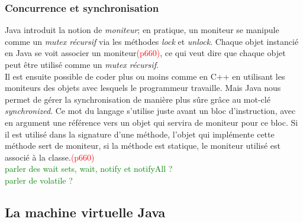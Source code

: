 \documentclass[a4paper,twoside,10pt,english,french,twocolumn]{article}
\theoremstyle{definition}
\theoremstyle{remark}
\theoremstyle{plain}
\begin{document}
\subsubsection*{Concurrence et synchronisation}
Java introduit la notion de \textit{moniteur}; en pratique, un moniteur se manipule comme un \textit{mutex récursif} via les méthodes \textit{lock} et \textit{unlock}. Chaque objet instancié en Java se voit associer un moniteur\textcolor{red}{(p660)}, ce qui veut dire que chaque objet peut être utilisé comme un \textit{mutex récursif}.\\
Il est ensuite possible de coder plus ou moins comme en C++ en utilisant les moniteurs des objets avec lesquels le programmeur travaille. Mais Java nous permet de gérer la synchronisation de manière plus sûre grâce au mot-clé \textit{synchronized}. Ce mot du langage s'utilise juste avant un bloc d'instruction, avec en argument une référence vers un objet qui servira de moniteur pour ce bloc. Si il est utilisé dans la signature d'une méthode, l'objet qui implémente cette méthode sert de moniteur, si la méthode est statique, le moniteur utilisé est associé à la classe.\textcolor{red}{(p660)}\\
\textcolor{green}{parler des wait sets, wait, notify et notifyAll ?\\parler de volatile ?}

\subsection{La machine virtuelle Java}
\end{document}
